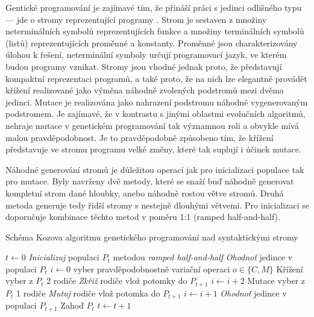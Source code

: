 Gentické programování je zajímavé tím, že přináší práci s jedinci odlišného typu --- jde o stromy reprezentující programy \cite{koza}. Strom je sestaven z množiny neterminálních symbolů reprezentujících funkce a množiny terminálních symbolů (listů) reprezentujících proměnné a konstanty. Proměnné jsou charakterizovány úlohou k řešení, neterminální symboly určují programovací jazyk, ve kterém budou programy vznikat. Stromy jsou vhodné jednak proto, že představují kompaktní reprezentaci programů, a také proto, že na nich lze elegantně provádět křížení realizované jako výměna náhodně zvolených podstromů mezi dvěma jedinci. Mutace je realizována jako nahrazení podstromu náhodně vygenerovaným podstromem. Je zajímavé, že v kontrastu s jinými oblastmi evolučních algoritmů, nehraje mutace v genetickém programování tak významnou roli a obvykle mívá malou pravděpodobnost. Je to pravděpodobně způsobeno tím, že křížení představuje ve stromu programu velké změny, které tak suplují i účinek mutace.

Náhodné generování stromů je důležitou operací jak pro inicializaci populace tak pro mutace. Byly navrženy dvě metody, které se snaží buď náhodně generovat kompletní strom dané hloubky, anebo náhodně rostou větve stromů. Druhá metoda generuje tedy řidší stromy s nestejně dlouhými větvemi. Pro inicializaci se doporučuje kombinace těchto metod v poměru 1:1 (ramped half-and-half).

\begin{algorithm}
\caption{Schéma Kozova algoritmu genetického programování nad syntaktickými stromy}
\label{obrsgp}
\begin{algorithmic}
\State $t \gets 0$
\State \emph{Inicializuj} populaci $P_t$ metodou \emph{ramped half-and-half}
\State \emph{Ohodnoť} jedince v populaci $P_t$
\State $i \gets 0$
\Repeat
\State vyber pravděpodobnostně variační operaci $o\in\{C,M\}$
 \Comment Křížení
\State vyber z $P_t$ 2 rodiče
\State \emph{Zkřiž} rodiče
\State vlož potomky do $P_{t+1}$
\State $i \gets i + 2$
\Else \Comment Mutace
\State vyber z $P_t$ 1 rodiče
\State \emph{Mutuj} rodiče
\State vlož potomka do $P_{t+1}$
\State $i \gets i + 1$
\EndIf
{}
\State \emph{Ohodnoť} jedince v populaci $P_{t+1}$
\State 	Zahoď $P_t$
\State $t \gets t+1$
\EndWhile
\EndProcedure
\end{algorithmic}
\end{algorithm}

